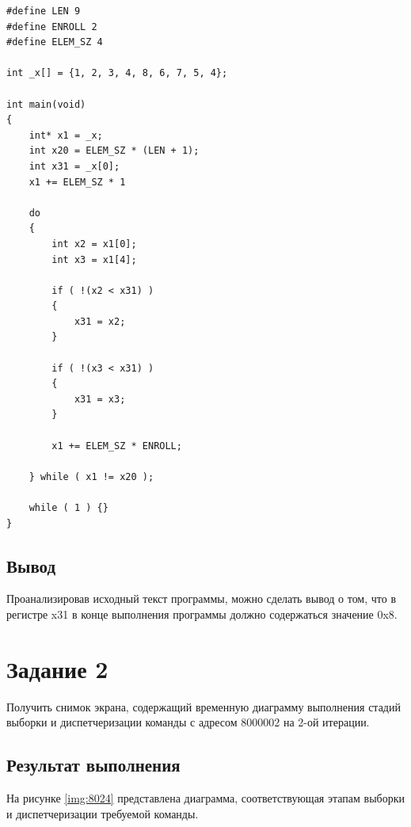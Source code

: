 \begin{center}
\captionsetup{justification=raggedright,singlelinecheck=off}
\begin{lstlisting}[label=lst:code,caption=Псевдокод программы на языке C]
#define LEN 9
#define ENROLL 2
#define ELEM_SZ 4

int _x[] = {1, 2, 3, 4, 8, 6, 7, 5, 4};

int main(void)
{
	int* x1 = _x;
	int x20 = ELEM_SZ * (LEN + 1);
	int x31 = _x[0];
	x1 += ELEM_SZ * 1
	
	do
	{
	    int x2 = x1[0];
	    int x3 = x1[4];
	    
	    if ( !(x2 < x31) )
	    {
	        x31 = x2;
	    }
	    
	    if ( !(x3 < x31) )
	    {
	        x31 = x3;
	    }
	    
	    x1 += ELEM_SZ * ENROLL;
	    
	} while ( x1 != x20 );
	
	while ( 1 ) {}
}
\end{lstlisting} 
\end{center}

\section{Вывод}

Проанализировав исходный текст программы, можно сделать вывод о том, что в регистре x31 в конце выполнения программы должно содержаться значение 0x8.

\chapter{Задание 2}

Получить снимок экрана, содержащий временную диаграмму выполнения стадий выборки и диспетчеризации команды с
адресом 8000002 на 2-ой итерации.

\section{Результат выполнения}

На рисунке \ref{img:8024} представлена диаграмма, соответствующая этапам выборки и диспетчеризации требуемой команды.

